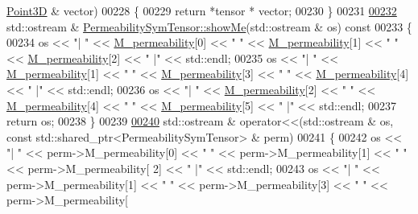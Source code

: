 \begin{DoxyCode}
      \hyperlink{classFVCode3D_1_1Point3D}{Point3D} & vector)
00228 \{
00229     \textcolor{keywordflow}{return} *tensor * vector;
00230 \}
00231 
\hypertarget{Permeability_8cpp_source.tex_l00232}{}\hyperlink{classFVCode3D_1_1PermeabilitySymTensor_a72332071c0bd6bb2ccdde36ca0b493a2}{00232} std::ostream & \hyperlink{classFVCode3D_1_1PermeabilitySymTensor_a72332071c0bd6bb2ccdde36ca0b493a2}{PermeabilitySymTensor::showMe}(std::ostream & os)\textcolor{keyword}{ const}
00233 \textcolor{keyword}{}\{
00234     os << \textcolor{stringliteral}{"| "} << \hyperlink{classFVCode3D_1_1PermeabilityBase_aef595aa25abfeaf51e8d242e5de2055d}{M\_permeability}[0] << \textcolor{stringliteral}{" "} << \hyperlink{classFVCode3D_1_1PermeabilityBase_aef595aa25abfeaf51e8d242e5de2055d}{M\_permeability}[1] << \textcolor{stringliteral}{" "} << 
      \hyperlink{classFVCode3D_1_1PermeabilityBase_aef595aa25abfeaf51e8d242e5de2055d}{M\_permeability}[2] << \textcolor{stringliteral}{" |"} << std::endl;
00235     os << \textcolor{stringliteral}{"| "} << \hyperlink{classFVCode3D_1_1PermeabilityBase_aef595aa25abfeaf51e8d242e5de2055d}{M\_permeability}[1] << \textcolor{stringliteral}{" "} << \hyperlink{classFVCode3D_1_1PermeabilityBase_aef595aa25abfeaf51e8d242e5de2055d}{M\_permeability}[3] << \textcolor{stringliteral}{" "} << 
      \hyperlink{classFVCode3D_1_1PermeabilityBase_aef595aa25abfeaf51e8d242e5de2055d}{M\_permeability}[4] << \textcolor{stringliteral}{" |"} << std::endl;
00236     os << \textcolor{stringliteral}{"| "} << \hyperlink{classFVCode3D_1_1PermeabilityBase_aef595aa25abfeaf51e8d242e5de2055d}{M\_permeability}[2] << \textcolor{stringliteral}{" "} << \hyperlink{classFVCode3D_1_1PermeabilityBase_aef595aa25abfeaf51e8d242e5de2055d}{M\_permeability}[4] << \textcolor{stringliteral}{" "} << 
      \hyperlink{classFVCode3D_1_1PermeabilityBase_aef595aa25abfeaf51e8d242e5de2055d}{M\_permeability}[5] << \textcolor{stringliteral}{" |"} << std::endl;
00237     \textcolor{keywordflow}{return} os;
00238 \}
00239 
\hypertarget{Permeability_8cpp_source.tex_l00240}{}\hyperlink{namespaceFVCode3D_aee190d20e7d59a358f6e3c5738473728}{00240} std::ostream & operator<<(std::ostream & os, const std::shared\_ptr<PermeabilitySymTensor> & perm)
00241 \{
00242     os << \textcolor{stringliteral}{"| "} << perm->M\_permeability[0] << \textcolor{stringliteral}{" "} << perm->M\_permeability[1] << \textcolor{stringliteral}{" "} << perm->M\_permeability[
      2] << \textcolor{stringliteral}{" |"} << std::endl;
00243     os << \textcolor{stringliteral}{"| "} << perm->M\_permeability[1] << \textcolor{stringliteral}{" "} << perm->M\_permeability[3] << \textcolor{stringliteral}{" "} << perm->M\_permeability[

\end{DoxyCode}
